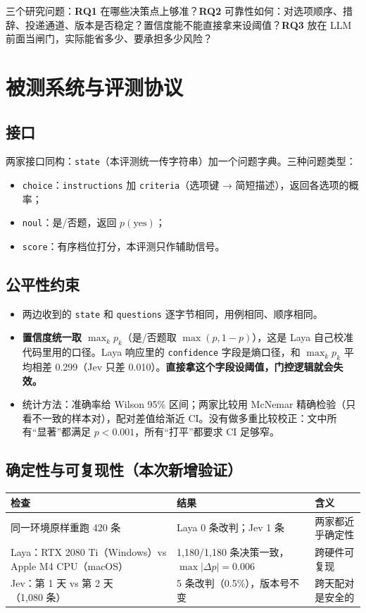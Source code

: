 \documentclass[UTF8,fontset=none,zihao=-4]{ctexart}
\newcommand{\laya}{\textsf{Laya}}
\newcommand{\jev}{\textsf{Jev}}
\begin{document}
三个研究问题：\textbf{RQ1} 在哪些决策点上够准？\textbf{RQ2} 可靠性如何：对选项顺序、措辞、投递通道、版本是否稳定？置信度能不能直接拿来设阈值？\textbf{RQ3} 放在 LLM 前面当闸门，实际能省多少、要承担多少风险？

\section{被测系统与评测协议}
\subsection{接口}
两家接口同构：\texttt{state}（本评测统一传字符串）加一个问题字典。三种问题类型：
\begin{itemize}
\item \texttt{choice}：\texttt{instructions} 加 \texttt{criteria}（选项键 → 简短描述），返回各选项的概率；
\item \texttt{noul}：是/否题，返回 $p(\text{yes})$；
\item \texttt{score}：有序档位打分，本评测只作辅助信号。
\end{itemize}

\subsection{公平性约束}
\begin{itemize}
\item 两边收到的 \texttt{state} 和 \texttt{questions} 逐字节相同，用例相同、顺序相同。
\item \textbf{置信度统一取 $\max_k p_k$}（是/否题取 $\max(p,1-p)$），这是 \laya{} 自己校准代码里用的口径。\laya{} 响应里的 \texttt{confidence} 字段是熵口径，和 $\max_k p_k$ 平均相差 0.299（\jev{} 只差 0.010）。\textbf{直接拿这个字段设阈值，门控逻辑就会失效。}
\item 统计方法：准确率给 Wilson 95\% 区间；两家比较用 McNemar 精确检验（只看不一致的样本对），配对差值给渐近 CI。没有做多重比较校正：文中所有“显著”都满足 $p<0.001$，所有“打平”都要求 CI 足够窄。
\end{itemize}

\subsection{确定性与可复现性（本次新增验证）}
\begin{center}\small
\begin{tabular}{@{}p{5.6cm}p{5.4cm}p{3.6cm}@{}}
\toprule
检查 & 结果 & 含义\\
\midrule
同一环境原样重跑 420 条 & \laya{} 0 条改判；\jev{} 1 条 & 两家都近乎确定性\\
\laya{}：RTX 2080 Ti（Windows）vs Apple M4 CPU（macOS） & 1{,}180/1{,}180 条决策一致，$\max|\Delta p|{=}0.006$ & 跨硬件可复现\\
\jev{}：第 1 天 vs 第 2 天（1{,}080 条） & 5 条改判（0.5\%），版本号不变 & 跨天配对是安全的\\
\bottomrule
\end{tabular}
\end{center}
\end{document}
